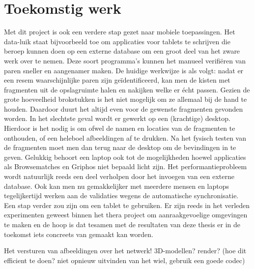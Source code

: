 \chapter{Toekomstig werk}
\label{toekomst}

Met dit project is ook een verdere stap gezet naar mobiele toepassingen. Het data-luik staat bijvoorbeeld toe om applicaties voor tablets te schrijven die beroep kunnen doen op een externe database om een groot deel van het zware werk over te nemen. Deze soort programma's kunnen het manueel verifi\"eren van paren sneller en aangenamer maken. De huidige werkwijze is als volgt: nadat er een resem waarschijnlijke paren zijn ge\"identificeerd, kan men de kisten met fragmenten uit de opslagruimte halen en nakijken welke er \'echt passen. Gezien de grote hoeveelheid brokstukken is het niet mogelijk om ze allemaal bij de hand te houden. Daardoor duurt het altijd even voor de gewenste fragmenten gevonden worden. In het slechtste geval wordt er gewerkt op een (krachtige) desktop. Hierdoor is het nodig is om ofwel de namen en locaties van de fragmenten te onthouden, of een heleboel afbeeldingen af te drukken. Na het fysisch testen van de fragmenten moet men dan terug naar de desktop om de bevindingen in te geven. Gelukkig behoort een laptop ook tot de mogelijkheden hoewel applicaties als Browsematches en Griphos niet bepaald licht zijn. Het performantieprobleem wordt natuurlijk reeds een deel verholpen door het invoegen van een externe database. Ook kan men nu gemakkelijker met meerdere mensen en laptops tegelijkertijd werken aan de validaties wegens de automatische synchronisatie. Een stap verder zou zijn om een tablet te gebruiken. Er zijn reeds in het verleden experimenten geweest binnen het thera project om aanraakgevoelige omgevingen te maken en de hoop is dat tesamen met de resultaten van deze thesis er in de toekomst iets concreets van gemaakt kan worden.

Het versturen van afbeeldingen over het netwerk! 3D-modellen? render? (hoe dit efficient te doen? niet opnieuw uitvinden van het wiel, gebruik een goede codec)